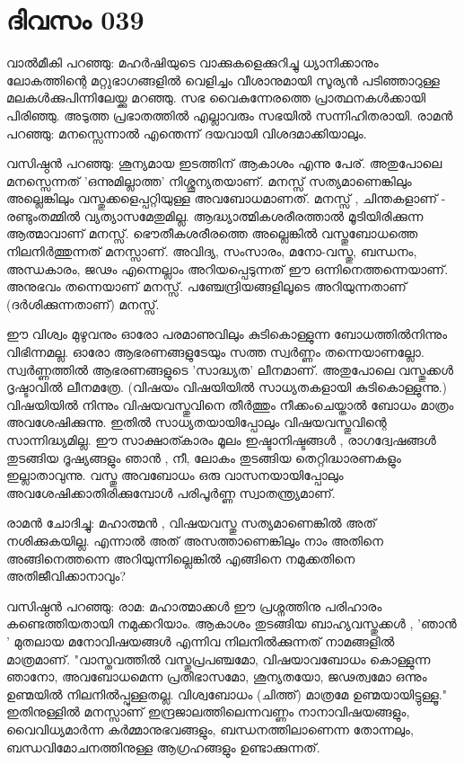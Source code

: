 \newpage
\section{ദിവസം 039}


വാല്‍മീകി പറഞ്ഞു: മഹര്‍ഷിയുടെ വാക്കുകളെക്കുറിച്ചു ധ്യാനിക്കാനും ലോകത്തിന്റെ മറ്റുഭാഗങ്ങളില്‍ വെളിച്ചം വീശാനുമായി സൂര്യന്‍ പടിഞ്ഞാറുള്ള മലകള്‍ക്കുപിന്നിലേയ്ക്കു മറഞ്ഞു. സഭ വൈകുന്നേരത്തെ പ്രാത്ഥനകള്‍ക്കായി പിരിഞ്ഞു. അടുത്ത പ്രഭാതത്തില്‍ എല്ലാവരും സഭയില്‍ സന്നിഹിതരായി. രാമന്‍ പറഞ്ഞു: മനസ്സെന്നാല്‍ എന്തെന്ന് ദയവായി വിശദമാക്കിയാലും.

വസിഷ്ഠന്‍ പറഞ്ഞു: ശൂന്യമായ ഇടത്തിന്‌ ആകാശം എന്നു പേര്‌. അതുപോലെ മനസ്സെന്നത്‌  'ഒന്നുമില്ലാത്ത' നിശ്ശൂന്യതയാണ്‌. മനസ്സ്‌ സത്യമാണെങ്കിലും അല്ലെങ്കിലും വസ്തുക്കളെപ്പറ്റിയുള്ള അവബോധമാണത്‌. മനസ്സ്‌ , ചിന്തകളാണ്‌ - രണ്ടുംതമ്മില്‍ വ്യത്യാസമേതുമില്ല. ആദ്ധ്യാത്മികശരീരത്താല്‍ മൂടിയിരിക്കുന്ന ആത്മാവാണ്‌ മനസ്സ്‌. ഭൌതീകശരീരത്തെ അല്ലെങ്കില്‍ വസ്തുബോധത്തെ നിലനിര്‍ത്തുന്നത്‌ മനസ്സാണ്‌. അവിദ്യ, സംസാരം, മനോ-വസ്തു, ബന്ധനം, അന്ധകാരം, ജഢം എന്നെല്ലാം അറിയപ്പെടുന്നത്‌ ഈ ഒന്നിനെത്തന്നെയാണ്‌. അനുഭവം തന്നെയാണ്‌ മനസ്സ്‌. പഞ്ചേന്ദ്രിയങ്ങളിലൂടെ അറിയുന്നതാണ്‌ (ദര്‍ശിക്കുന്നതാണ്‌) മനസ്സ്‌.

ഈ വിശ്വം മുഴുവനും ഓരോ പരമാണുവിലും കുടികൊള്ളുന്ന ബോധത്തില്‍നിന്നും വിഭിന്നമല്ല. ഓരോ ആഭരണങ്ങളുടേയും സത്ത സ്വര്‍ണ്ണം തന്നെയാണല്ലോ. സ്വര്‍ണ്ണത്തില്‍ ആഭരണങ്ങളുടെ 'സാദ്ധ്യത' ലീനമാണ്‌. അതുപോലെ വസ്തുക്കള്‍ ദൃഷ്ടാവില്‍ ലീനമത്രേ. (വിഷയം വിഷയിയില്‍ സാധ്യതകളായി കുടികൊള്ളുന്നു.) വിഷയിയില്‍ നിന്നും വിഷയവസ്തുവിനെ തീര്‍ത്തും നീക്കംചെയ്താല്‍ ബോധം മാത്രം അവശേഷിക്കുന്നു. ഇതില്‍ സാധ്യതയായിപ്പോലും വിഷയവസ്തുവിന്റെ സാന്നിദ്ധ്യമില്ല. ഈ സാക്ഷാത്കാരം മൂലം ഇഷ്ടാനിഷ്ടങ്ങള്‍ , രാഗദ്വേഷങ്ങള്‍ തുടങ്ങിയ ദൂഷ്യങ്ങളും ഞാന്‍ , നീ, ലോകം തുടങ്ങിയ തെറ്റിദ്ധാരണകളും ഇല്ലാതാവുന്നു. വസ്തു അവബോധം ഒരു വാസനയായിപ്പോലും അവശേഷിക്കാതിരിക്കുമ്പോള്‍ പരിപൂര്‍ണ്ണ സ്വാതന്ത്ര്യമാണ്‌. 

രാമന്‍ ചോദിച്ചു: മഹാത്മന്‍ , വിഷയവസ്തു സത്യമാണെങ്കില്‍ അത്‌ നശിക്കുകയില്ല. എന്നാല്‍ അത്‌ അസത്താണെങ്കിലും നാം അതിനെ അങ്ങിനെത്തന്നെ അറിയുന്നില്ലെങ്കില്‍ എങ്ങിനെ  നമുക്കതിനെ അതിജീവിക്കാനാവും?

വസിഷ്ഠന്‍ പറഞ്ഞു: രാമ: മഹാത്മാക്കള്‍ ഈ പ്രശ്നത്തിനു പരിഹാരം കണ്ടെത്തിയതായി നമുക്കറിയാം. ആകാശം തുടങ്ങിയ ബാഹ്യവസ്തുക്കള്‍ , 'ഞാന്‍ ' മുതലായ മനോവിഷയങ്ങള്‍ എന്നിവ നിലനില്‍ക്കുന്നത്‌ നാമങ്ങളില്‍ മാത്രമാണ്‌. "വാസ്തവത്തില്‍ വസ്തുപ്രപഞ്ചമോ, വിഷയാവബോധം കൊള്ളുന്ന ഞാനോ, അവബോധമെന്ന പ്രതിഭാസമോ, ശൂന്യതയോ, ജഢത്വമോ ഒന്നും ഉണ്മയില്‍ നിലനില്‍പ്പുള്ളതല്ല. വിശ്വബോധം (ചിത്ത്‌) മാത്രമേ ഉണ്മയായിട്ടുള്ളൂ." ഇതിനുള്ളില്‍ മനസ്സാണ്‌ ഇന്ദ്രജാലത്തിലെന്നവണ്ണം നാനാവിഷയങ്ങളും, വൈവിധ്യമാര്‍ന്ന കര്‍മ്മാനുഭവങ്ങളും, ബന്ധനത്തിലാണെന്ന തോന്നലും, ബന്ധവിമോചനത്തിനുള്ള ആഗ്രഹങ്ങളും ഉണ്ടാക്കുന്നത്‌. 
